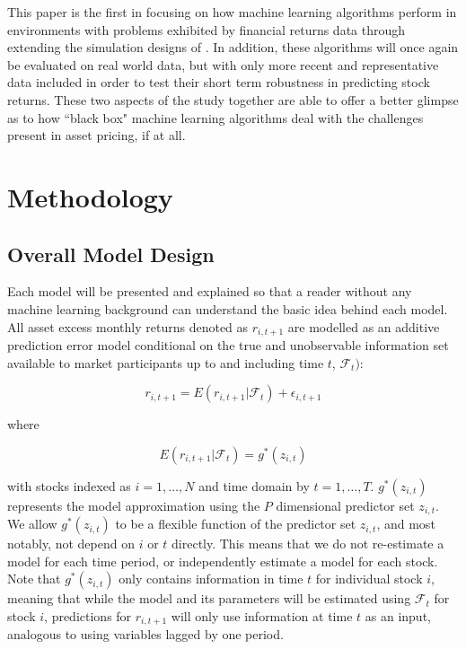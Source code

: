 \documentclass[a4paper, table]{article}
\begin{document}
This paper is the first in focusing on how machine learning algorithms perform in environments with problems exhibited by financial returns data through extending the simulation designs of \cite{gu_empirical_2018}. In addition, these algorithms will once again be evaluated on real world data, but with only more recent and representative data included in order to test their short term robustness in predicting stock returns. These two aspects of the study together are able to offer a better glimpse as to how ``black box" machine learning algorithms deal with the challenges present in asset pricing, if at all.


\section{Methodology}

\subsection{Overall Model Design}

Each model will be presented and explained so that a reader without any machine learning background can understand the basic idea behind each model. All asset excess monthly returns denoted as $r_{i, t+1}$ are modelled as an additive prediction error model conditional on the true and unobservable information set available to market participants up to and including time $t$, $\mathcal{F}_t)$:

\begin{equation}
	r_{i, t+1} = E(r_{i, t+1} | \mathcal{F}_t) + \epsilon_{i, t+1}
\end{equation}

where 

\begin{equation}
	E(r_{i, t+1} | \mathcal{F}_t) = g^*(z_{i,t})
\end{equation}

with stocks indexed as $i = 1, \dots, N$ and time domain by $t = 1, \dots, T$. $g^*(z_{i,t})$ represents the model approximation using the $P$ dimensional predictor set $z_{i,t}$. We allow $g^*(z_{i,t})$ to be a flexible function of the predictor set $z_{i,t}$, and most notably, not depend on $i$ or $t$ directly. This means that we do not re-estimate a model for each time period, or independently estimate a model for each stock. Note that $g^*(z_{i,t})$ only contains information in time $t$ for individual stock $i$, meaning that while the model and its parameters will be estimated using $\mathcal{F}_t$ for stock $i$, predictions for $r_{i, t+1}$ will only use information at time $t$ as an input, analogous to using variables lagged by one period. 
\end{document}
